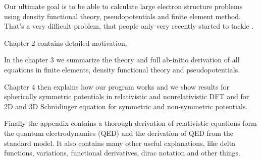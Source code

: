 Our ultimate goal is to be able to calculate large electron structure problems
using density functional theory, pseudopotentials and finite element method.
That's a very difficult problem, that people only very recently started to
tackle \cite{pask1, pask2, ortiz1, ortiz2}.

Chapter 2 contains detailed motivation.

In the chapter 3 we summarize the theory and full ab-initio
derivation of all equations in finite elements, density functional theory and
pseudopotentials.

Chapter 4 then explains how our program works and we show results for
spherically symmetric potentials in relativistic and nonrelativistic DFT and
for 2D and 3D Schr\"odinger equation for symmetric and non-symmetric
potentials.

Finally the appendix contains a thorough derivation of relativistic equations
form the quantum electrodynamics (QED) and the derivation of QED from the
standard model. It also contains many other useful explanations, like delta
functions, variations, functional derivatives, dirac notation and other things.
